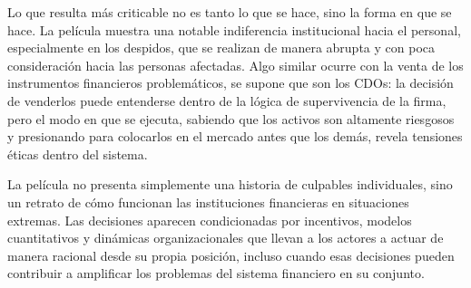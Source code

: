 Lo que resulta más criticable no es tanto lo que se hace, sino la forma en que se hace. La película muestra una notable indiferencia institucional hacia el personal, especialmente en los despidos, que se realizan de manera abrupta y con poca consideración hacia las personas afectadas. Algo similar ocurre con la venta de los instrumentos financieros problemáticos, se supone que son los CDOs: la decisión de venderlos puede entenderse dentro de la lógica de supervivencia de la firma, pero el modo en que se ejecuta, sabiendo que los activos son altamente riesgosos y presionando para colocarlos en el mercado antes que los demás, revela tensiones éticas dentro del sistema.

La película no presenta simplemente una historia de culpables individuales, sino un retrato de cómo funcionan las instituciones financieras en situaciones extremas. Las decisiones aparecen condicionadas por incentivos, modelos cuantitativos y dinámicas organizacionales que llevan a los actores a actuar de manera racional desde su propia posición, incluso cuando esas decisiones pueden contribuir a amplificar los problemas del sistema financiero en su conjunto.
